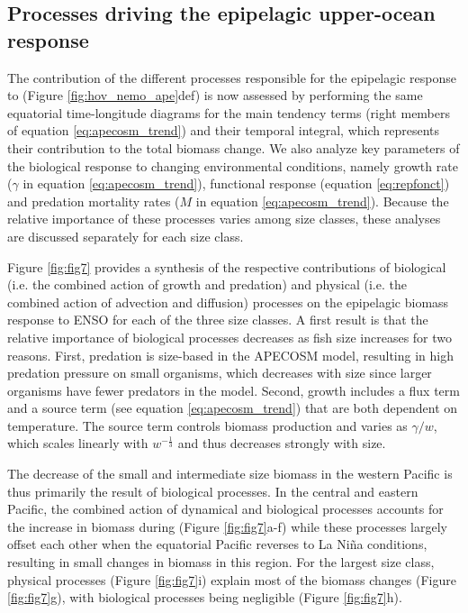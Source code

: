 \subsection{Processes driving the epipelagic upper-ocean response}

The contribution of the different processes responsible for the epipelagic response to \nino{} (Figure \ref{fig:hov_nemo_ape}def) is now assessed by performing the same equatorial time-longitude diagrams for the main tendency terms (right members of equation \ref{eq:apecosm_trend}) and their temporal integral, which represents their contribution to the total biomass change. We also analyze key parameters of the biological response to changing environmental conditions, namely growth rate ($\gamma$ in equation \ref{eq:apecosm_trend}), functional response (equation \ref{eq:repfonct}) and predation mortality rates ($M$ in equation \ref{eq:apecosm_trend}). Because the relative importance of these processes varies among size classes, these analyses are discussed separately for each size class.

Figure \ref{fig:fig7} provides a synthesis of the respective contributions of biological (i.e. the combined action of growth and predation) and physical (i.e. the combined action of advection and diffusion) processes on the epipelagic biomass response to ENSO for each of the three size classes. A first result is that the relative importance of biological processes decreases as fish size increases for two reasons. First, predation is size-based in the APECOSM model, resulting in high predation pressure on small organisms, which decreases with size since larger organisms have fewer predators in the model. Second, growth includes a flux term and a source term (see equation \ref{eq:apecosm_trend}) that are both dependent on temperature. The source term controls biomass production and varies as ${\gamma}/{w}$, which scales linearly with $w^{-\frac{1}{3}}$ and thus decreases strongly with size.

The decrease of the small and intermediate size biomass in the western Pacific is thus primarily the result of biological processes. In the central and eastern Pacific, the combined action of dynamical and biological processes accounts for the increase in biomass during \nino{} (Figure \ref{fig:fig7}a-f) while these processes largely offset each other when the equatorial Pacific reverses to La Niña conditions, resulting in small  changes in biomass in this region. For the largest size class, physical processes (Figure \ref{fig:fig7}i) explain most of the biomass changes (Figure \ref{fig:fig7}g), with biological processes being negligible (Figure \ref{fig:fig7}h).

